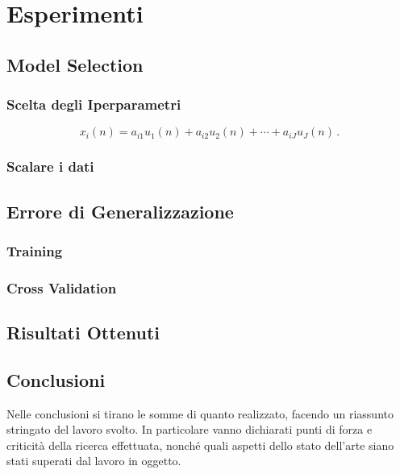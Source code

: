 \documentclass[12pt,italian]{report}
\begin{document}
\chapter{Esperimenti}
\label{cap3}



\section{Model Selection}

\subsection{Scelta degli Iperparametri}

\begin{equation}
x_i(n) = a_{i1}u_1(n) + a_{i2}u_2(n) + \cdots + a_{iJ}u_J(n) \, .
\label{eq:multimix}
\end{equation}

\subsection{Scalare i dati}


\section{Errore di Generalizzazione}
\label{sec:errore}


\subsection{Training}



\subsection{Cross Validation}



\section{Risultati Ottenuti}
\label{sec:risultati}


% 
% 
\section{Conclusioni}

Nelle conclusioni si tirano le somme di quanto realizzato, facendo un riassunto stringato del lavoro svolto. In particolare vanno dichiarati punti di forza e criticità della ricerca effettuata, nonché quali aspetti dello stato dell'arte siano stati superati dal lavoro in oggetto.

%
%



\end{document}
